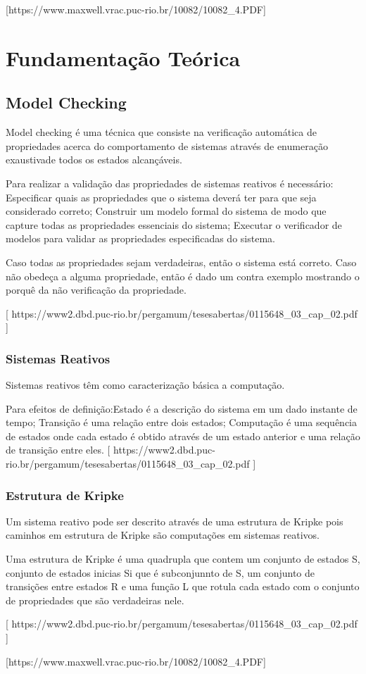 
[https://www.maxwell.vrac.puc-rio.br/10082/10082\_4.PDF]   

\section{Fundamentação Teórica}

\subsection{Model Checking}
Model checking é uma técnica que consiste na verificação automática de propriedades acerca do comportamento de sistemas através de enumeração exaustivade todos os estados alcançáveis. 

Para realizar a validação das propriedades de sistemas reativos é necessário:
Especificar quais as propriedades que o sistema deverá ter para que seja considerado correto; Construir um modelo formal do sistema de modo que capture todas as propriedades essenciais do sistema; Executar o verificador de modelos para validar as propriedades especificadas do sistema.

Caso todas as propriedades sejam verdadeiras, então o sistema está correto. Caso não obedeça a alguma propriedade, então é dado um contra exemplo mostrando o porquê da não verificação da propriedade.

[ https://www2.dbd.puc-rio.br/pergamum/tesesabertas/0115648\_03\_cap\_02.pdf ]



\subsubsection{Sistemas Reativos}
Sistemas reativos têm como caracterização básica a computação.

Para efeitos de definição:Estado é a descrição do sistema em um dado instante de tempo; Transição é uma relação entre dois estados; 
Computação é uma sequência de estados onde cada estado é obtido através de um estado anterior e uma relação de transição entre eles.
[ https://www2.dbd.puc-rio.br/pergamum/tesesabertas/0115648\_03\_cap\_02.pdf ]

\subsubsection{Estrutura de Kripke}

Um sistema reativo pode ser descrito através de uma estrutura de Kripke pois caminhos em estrutura de Kripke são computações em sistemas reativos.

Uma estrutura de Kripke é uma quadrupla que contem um conjunto de estados S, conjunto de estados inicias Si que é subconjunnto de S, um conjunto de transições entre estados R e uma função L que rotula cada estado com o conjunto de propriedades que são verdadeiras nele.

[ https://www2.dbd.puc-rio.br/pergamum/tesesabertas/0115648\_03\_cap\_02.pdf ]

[https://www.maxwell.vrac.puc-rio.br/10082/10082\_4.PDF]